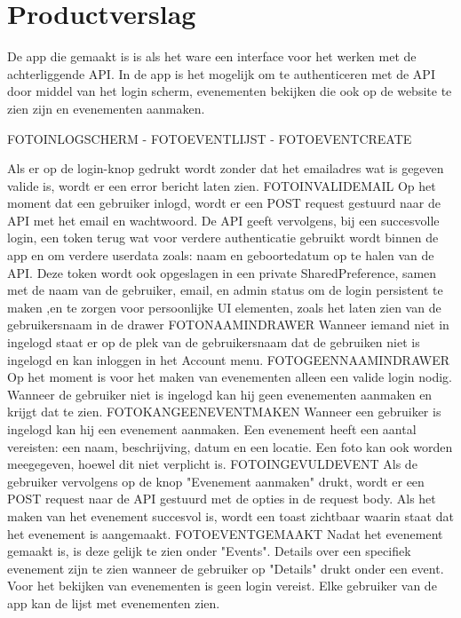 \documentclass[dutch]{report}
\begin{document}
	\newpage
	
	\section{Productverslag}
	De app die gemaakt is is als het ware een interface voor het werken met de achterliggende API.
	In de app is het mogelijk om te authenticeren met de API door middel van het login scherm, evenementen bekijken die ook op de website te zien zijn en evenementen aanmaken.
	
	FOTOINLOGSCHERM - FOTOEVENTLIJST - FOTOEVENTCREATE
	
	Als er op de login-knop gedrukt wordt zonder dat het emailadres wat is gegeven valide is, wordt er een error bericht laten zien.
	FOTOINVALIDEMAIL
	Op het moment dat een gebruiker inlogd, wordt er een POST request gestuurd naar de API met het email en wachtwoord. De API geeft vervolgens,
	bij een succesvolle login, een token terug wat voor verdere authenticatie gebruikt wordt binnen de app en om verdere userdata zoals: naam en geboortedatum
	op te halen van de API.
	Deze token wordt ook opgeslagen in een private SharedPreference, samen met de naam van de gebruiker, email, en admin status om de login persistent te maken
	,en te zorgen voor persoonlijke UI elementen, zoals het laten zien van de gebruikersnaam in de drawer FOTONAAMINDRAWER
	Wanneer iemand niet in ingelogd staat er op de plek van de gebruikersnaam dat de gebruiken niet is ingelogd en kan inloggen in het Account menu. FOTOGEENNAAMINDRAWER
	Op het moment is voor het maken van evenementen alleen een valide login nodig. Wanneer de gebruiker niet is ingelogd kan hij geen evenementen aanmaken en krijgt dat te zien. FOTOKANGEENEVENTMAKEN
	Wanneer een gebruiker is ingelogd kan hij een evenement aanmaken. Een evenement heeft een aantal vereisten: een naam, beschrijving, datum en een locatie. Een foto kan ook worden meegegeven,
	hoewel dit niet verplicht is. FOTOINGEVULDEVENT Als de gebruiker vervolgens op de knop "Evenement aanmaken" drukt, wordt er een POST request naar de API gestuurd met de opties in de 
	request body. Als het maken van het evenement succesvol is, wordt een toast zichtbaar waarin staat dat het evenement is aangemaakt. 
	FOTOEVENTGEMAAKT
	Nadat het evenement gemaakt is, is deze gelijk te zien onder "Events". 
	Details over een specifiek evenement zijn te zien wanneer de gebruiker op "Details" drukt onder een event.
	Voor het bekijken van evenementen is geen login vereist. Elke gebruiker van de app kan de lijst met evenementen zien.
	
\end{document}
